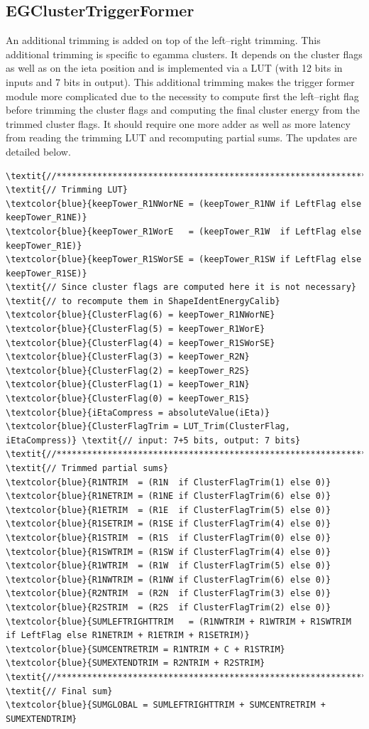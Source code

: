 \documentclass[a4paper, 12pt]{article}
\begin{document}
\subsection{EGClusterTriggerFormer}

An additional trimming is added on top of the left--right trimming. This additional trimming is specific to egamma clusters. It depends on the cluster flags as well as on the ieta position and is implemented via a LUT (with 12 bits in inputs and 7 bits in output).
%
This additional trimming makes the trigger former module more complicated due to the necessity to compute first the left--right flag before trimming the cluster flags and computing the final cluster energy from the trimmed cluster flags. It should require one more adder as well as more latency from reading the trimming LUT and recomputing partial sums. The updates are detailed below.

\begin{Verbatim}[label={EG cluster energy sums}]
\textit{//******************************************************************//}
\textit{// Trimming LUT}
\textcolor{blue}{keepTower_R1NWorNE = (keepTower_R1NW if LeftFlag else keepTower_R1NE)}
\textcolor{blue}{keepTower_R1WorE   = (keepTower_R1W  if LeftFlag else keepTower_R1E)}
\textcolor{blue}{keepTower_R1SWorSE = (keepTower_R1SW if LeftFlag else keepTower_R1SE)}
\textit{// Since cluster flags are computed here it is not necessary}
\textit{// to recompute them in ShapeIdentEnergyCalib}
\textcolor{blue}{ClusterFlag(6) = keepTower_R1NWorNE}
\textcolor{blue}{ClusterFlag(5) = keepTower_R1WorE}
\textcolor{blue}{ClusterFlag(4) = keepTower_R1SWorSE}
\textcolor{blue}{ClusterFlag(3) = keepTower_R2N}
\textcolor{blue}{ClusterFlag(2) = keepTower_R2S}
\textcolor{blue}{ClusterFlag(1) = keepTower_R1N}
\textcolor{blue}{ClusterFlag(0) = keepTower_R1S}
\textcolor{blue}{iEtaCompress = absoluteValue(iEta)}
\textcolor{blue}{ClusterFlagTrim = LUT_Trim(ClusterFlag, iEtaCompress)} \textit{// input: 7+5 bits, output: 7 bits}
\textit{//******************************************************************//}
\textit{// Trimmed partial sums}
\textcolor{blue}{R1NTRIM  = (R1N  if ClusterFlagTrim(1) else 0)}
\textcolor{blue}{R1NETRIM = (R1NE if ClusterFlagTrim(6) else 0)}
\textcolor{blue}{R1ETRIM  = (R1E  if ClusterFlagTrim(5) else 0)}
\textcolor{blue}{R1SETRIM = (R1SE if ClusterFlagTrim(4) else 0)}
\textcolor{blue}{R1STRIM  = (R1S  if ClusterFlagTrim(0) else 0)}
\textcolor{blue}{R1SWTRIM = (R1SW if ClusterFlagTrim(4) else 0)}
\textcolor{blue}{R1WTRIM  = (R1W  if ClusterFlagTrim(5) else 0)}
\textcolor{blue}{R1NWTRIM = (R1NW if ClusterFlagTrim(6) else 0)}
\textcolor{blue}{R2NTRIM  = (R2N  if ClusterFlagTrim(3) else 0)}
\textcolor{blue}{R2STRIM  = (R2S  if ClusterFlagTrim(2) else 0)}
\textcolor{blue}{SUMLEFTRIGHTTRIM   = (R1NWTRIM + R1WTRIM + R1SWTRIM if LeftFlag else R1NETRIM + R1ETRIM + R1SETRIM)}
\textcolor{blue}{SUMCENTRETRIM = R1NTRIM + C + R1STRIM}
\textcolor{blue}{SUMEXTENDTRIM = R2NTRIM + R2STRIM}
\textit{//******************************************************************//}
\textit{// Final sum}
\textcolor{blue}{SUMGLOBAL = SUMLEFTRIGHTTRIM + SUMCENTRETRIM + SUMEXTENDTRIM}
\end{Verbatim}
\end{document}
